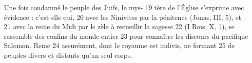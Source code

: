 Une fois condamné le peuple des Juifs, le mys-	 
19	 	tère de l'Église s'exprime avec évidence : c'est elle qui,	 
20	 	avec les Ninivites par la pénitence (Jonas, III, 5), et	 
21	 	avec la reine du Midi par le zèle à recueillir la sagesse	 
22	 	(I Rois, X, 1), se rassemble des confins du monde entier	 
23	 	pour connaître les discours du pacifique Salomon. Reine	 
24	 	assurément, dont le royaume est indivis, ne formant	 
25	 	de peuples divers et distants qu'un seul corps.
